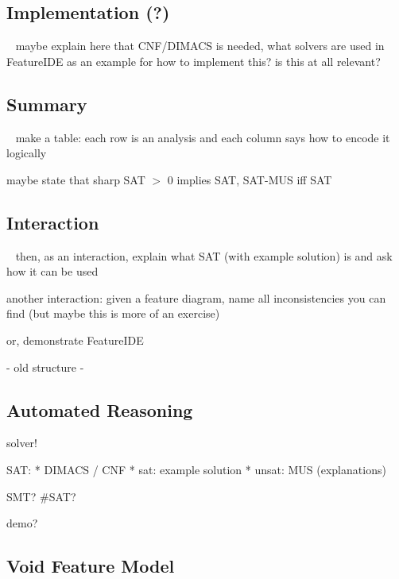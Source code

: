 \subsection{Implementation (?)}
\begin{frame}{~}
    maybe explain here that CNF/DIMACS is needed, what solvers are used in FeatureIDE as an example for how to implement this? is this at all relevant?
\end{frame}

\subsection{Summary}
\begin{frame}{~}
    make a table: each row is an analysis and each column says how to encode it logically

    maybe state that sharp SAT $>$ 0 implies SAT, SAT-MUS iff SAT
\end{frame}

\subsection{Interaction}
\begin{frame}{~}
    then, as an interaction, explain what SAT (with example solution) is and ask how it can be used

    another interaction: given a feature diagram, name all inconsistencies you can find (but maybe this is more of an exercise)

    or, demonstrate FeatureIDE
\end{frame}


- old structure -

\subsection{Automated Reasoning}

solver!

SAT:
* DIMACS / CNF
* sat: example solution
* unsat: MUS (explanations)

SMT? \#SAT?

demo?

\subsection{Void Feature Model}

